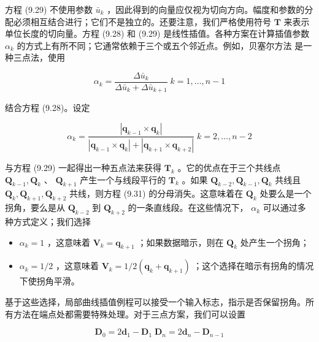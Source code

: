 \documentclass[../main.tex]{subfiles}
\begin{document}
方程 (9.29) 不使用参数 \({\bar{u}}_{k}\) ，因此得到的向量应仅视为切向方向。幅度和参数的分配必须相互结合进行；它们不是独立的。还要注意，我们严格使用符号 \(\mathbf{T}\) 来表示单位长度的切向量。方程 (9.28) 和 (9.29) 是线性插值。各种方案在计算插值参数 \({\alpha }_{k}\) 的方式上有所不同；它通常依赖于三个或五个邻近点。例如，贝塞尔方法 \cite{DeBo78} 是一种三点法，使用

\[
{\alpha }_{k} = \frac{\Delta {\bar{u}}_{k}}{\Delta {\bar{u}}_{k} + \Delta {\bar{u}}_{k + 1}}\;k = 1,\ldots ,n - 1 \tag{9.30}
\]

结合方程 (9.28)。设定

\[
{\alpha }_{k} = \frac{\left| {\mathbf{q}}_{k - 1} \times  {\mathbf{q}}_{k}\right| }{\left| {{\mathbf{q}}_{k - 1} \times  {\mathbf{q}}_{k}}\right|  + \left| {{\mathbf{q}}_{k + 1} \times  {\mathbf{q}}_{k + 2}}\right| }\;k = 2,\ldots ,n - 2 \tag{9.31}
\]

与方程 (9.29) 一起得出一种五点法来获得 \({\mathbf{T}}_{k}\) \cite{Akim70,Renn82,Pieg87d}。它的优点在于三个共线点 \({\mathbf{Q}}_{k - 1},{\mathbf{Q}}_{k}\) 、 \({\mathbf{Q}}_{k + 1}\) 产生一个与线段平行的 \({\mathbf{T}}_{k}\) 。如果 \({\mathbf{Q}}_{k - 2},{\mathbf{Q}}_{k - 1},{\mathbf{Q}}_{k}\) 共线且 \({\mathbf{Q}}_{k},{\mathbf{Q}}_{k + 1},{\mathbf{Q}}_{k + 2}\) 共线，则方程 (9.31) 的分母消失。这意味着在 \({\mathbf{Q}}_{k}\) 处要么是一个拐角，要么是从 \({\mathbf{Q}}_{k - 2}\) 到 \({\mathbf{Q}}_{k + 2}\) 的一条直线段。在这些情况下， \({\alpha }_{k}\) 可以通过多种方式定义；我们选择





\begin{itemize}
\item \({\alpha }_{k} = 1\) ，这意味着 \({\mathbf{V}}_{k} = {\mathbf{q}}_{k + 1}\) ；如果数据暗示，则在 \({\mathbf{Q}}_{k}\) 处产生一个拐角；
\end{itemize}

\begin{itemize}
\item \({\alpha }_{k} = 1/2\) ，这意味着 \({\mathbf{V}}_{k} = 1/2\left( {{\mathbf{q}}_{k} + {\mathbf{q}}_{k + 1}}\right)\) ；这个选择在暗示有拐角的情况下使拐角平滑。
\end{itemize}

基于这些选择，局部曲线插值例程可以接受一个输入标志，指示是否保留拐角。所有方法在端点处都需要特殊处理。对于三点方案，我们可以设置

\[
{\mathbf{D}}_{0} = 2{\mathbf{d}}_{1} - {\mathbf{D}}_{1}\;{\mathbf{D}}_{n} = 2{\mathbf{d}}_{n} - {\mathbf{D}}_{n - 1} \tag{9.32}
\]
\end{document}
